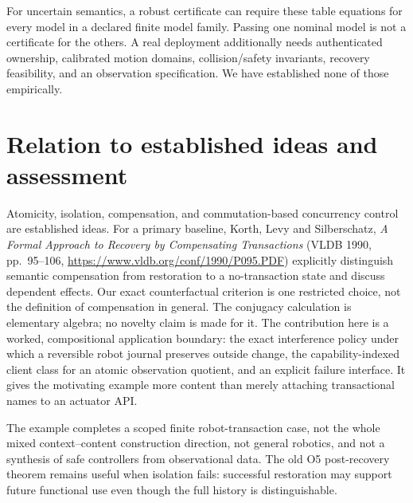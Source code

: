 \documentclass[11pt]{article}
\begin{document}
For uncertain semantics, a robust certificate can require these table equations for every model in a declared finite model family. Passing one nominal model is not a certificate for the others. A real deployment additionally needs authenticated ownership, calibrated motion domains, collision/safety invariants, recovery feasibility, and an observation specification. We have established none of those empirically.

\section{Relation to established ideas and assessment}
Atomicity, isolation, compensation, and commutation-based concurrency control are established ideas. For a primary baseline, Korth, Levy and Silberschatz, \emph{A Formal Approach to Recovery by Compensating Transactions} (VLDB 1990, pp.~95--106, \url{https://www.vldb.org/conf/1990/P095.PDF}) explicitly distinguish semantic compensation from restoration to a no-transaction state and discuss dependent effects. Our exact counterfactual criterion is one restricted choice, not the definition of compensation in general. The conjugacy calculation is elementary algebra; no novelty claim is made for it. The contribution here is a worked, compositional application boundary: the exact interference policy under which a reversible robot journal preserves outside change, the capability-indexed client class for an atomic observation quotient, and an explicit failure interface. It gives the motivating example more content than merely attaching transactional names to an actuator API.

The example completes a scoped finite robot-transaction case, not the whole mixed context--content construction direction, not general robotics, and not a synthesis of safe controllers from observational data. The old O5 post-recovery theorem remains useful when isolation fails: successful restoration may support future functional use even though the full history is distinguishable.
\end{document}
